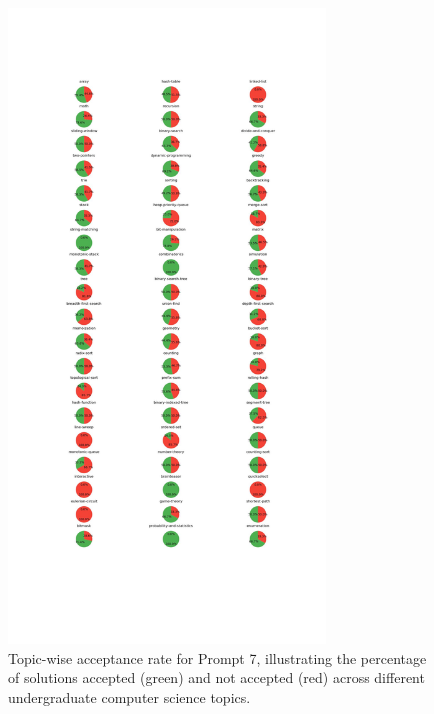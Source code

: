 \begin{figure}[H]
    \centering
    \includegraphics[width=0.75\textwidth, height=0.7\textheight]{figures/7/accepted_not_topicwise.jpg}
    \caption{Topic-wise acceptance rate for Prompt 7, illustrating the percentage of solutions accepted (green) and not accepted (red) across different undergraduate computer science topics.}
    \label{fig:topic_wise_acceptance_prompt_7}
\end{figure}

